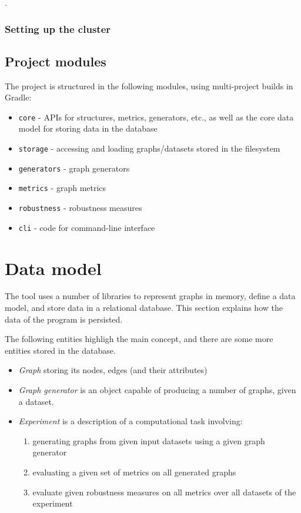 .

\subsubsection*{Setting up the cluster}

\subsection{Project modules}

The project is structured in the following modules, using multi-project builds in Gradle:
\begin{itemize}
    \item \texttt{core} - APIs for structures, metrics, generators, etc., as well as the core data model for storing data in the database
    \item \texttt{storage} - accessing and loading graphs/datasets stored in the filesystem
    \item \texttt{generators} - graph generators
    \item \texttt{metrics} - graph metrics
    \item \texttt{robustness} - robustness measures
    \item \texttt{cli} - code for command-line interface
\end{itemize}



\section{Data model}

The \graffs tool uses a number of libraries to represent graphs in memory, define a data model, and store data in a relational database.
This section explains how the data of the program is persisted.

The following entities highligh the main concept, and there are some more entities stored in the database.
\begin{itemize}[topsep=5pt]
    \item \textsl{Graph} storing its nodes, edges (and their attributes)
    \item \textsl{Graph generator} is an object capable of producing a number of graphs, given a dataset.
    \item \textsl{Experiment} is a description of a computational task involving:
    \begin{enumerate}[topsep=5pt]
        \item generating graphs from given input datasets using a given graph generator
        \item evaluating a given set of metrics on all generated graphs
        \item evaluate given robustness measures on all metrics over all datasets of the experiment
    \end{enumerate}
\end{itemize}


